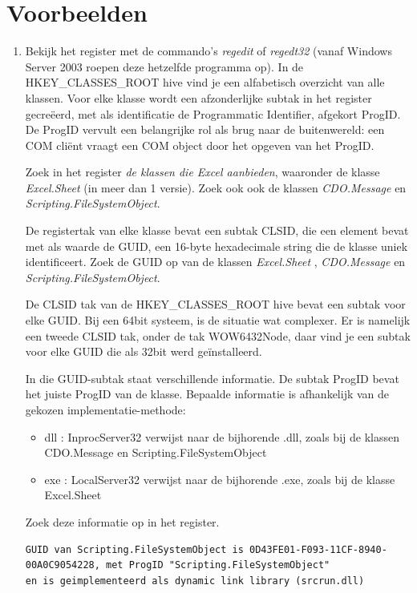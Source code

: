 \documentclass[11pt,a4paper]{report}
\begin{document}
\section{Voorbeelden}
\begin{enumerate}
	\item Bekijk het register met de commando's \textit{regedit} of \textit{regedt32} (vanaf Windows Server 2003 roepen deze hetzelfde programma op). In de HKEY\_CLASSES\_ROOT hive vind je een alfabetisch overzicht van alle klassen. Voor elke klasse wordt een afzonderlijke subtak in het register gecreëerd, met als identificatie de Programmatic Identifier, afgekort ProgID. De ProgID vervult een belangrijke rol als brug naar de buitenwereld: een COM cliënt vraagt een COM object door het opgeven van het ProgID.
	\par Zoek in het register \textit{de klassen die Excel aanbieden}, waaronder de klasse \textit{Excel.Sheet} (in meer dan 1 versie). Zoek ook ook de klassen \textit{CDO.Message} en \textit{Scripting.FileSystemObject}. 
	\par De registertak van elke klasse bevat een subtak CLSID, die een element bevat met als waarde de GUID, een 16-byte hexadecimale string die de klasse uniek identificeert. Zoek de GUID op van de klassen \textit{Excel.Sheet} , \textit{CDO.Message} en \textit{Scripting.FileSystemObject}.
	\par De CLSID tak van de HKEY\_CLASSES\_ROOT hive bevat een subtak voor elke GUID.
	Bij een 64bit systeem, is de situatie wat complexer. Er is namelijk een tweede CLSID tak, onder de tak WOW6432Node, daar vind je een subtak voor elke GUID die als 32bit werd geïnstalleerd.
	
	In die GUID-subtak staat verschillende informatie. De subtak ProgID bevat het juiste ProgID van de klasse. Bepaalde informatie is afhankelijk van de gekozen implementatie-methode:
	\begin{itemize}
	\item dll : InprocServer32 verwijst naar de bijhorende .dll, zoals bij de klassen CDO.Message en Scripting.FileSystemObject
	\item exe : LocalServer32 verwijst naar de bijhorende .exe, zoals bij de klasse Excel.Sheet
	\end{itemize}	
	Zoek deze informatie op in het register.
	\\
\begin{lstlisting}
GUID van Scripting.FileSystemObject is 0D43FE01-F093-11CF-8940-00A0C9054228, met ProgID "Scripting.FileSystemObject" 
en is geimplementeerd als dynamic link library (srcrun.dll)


\end{lstlisting}
\end{enumerate}
\end{document}
